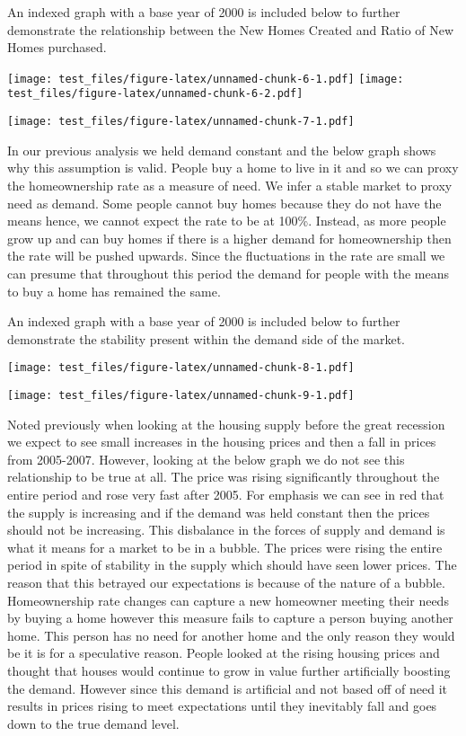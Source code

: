 \documentclass[
]{article}
\begin{document}
An indexed graph with a base year of 2000 is included below to further
demonstrate the relationship between the New Homes Created and Ratio of
New Homes purchased.

\texttt{[image: test\_files/figure-latex/unnamed-chunk-6-1.pdf]}
\texttt{[image: test\_files/figure-latex/unnamed-chunk-6-2.pdf]}

\texttt{[image: test\_files/figure-latex/unnamed-chunk-7-1.pdf]}

In our previous analysis we held demand constant and the below graph
shows why this assumption is valid. People buy a home to live in it and
so we can proxy the homeownership rate as a measure of need. We infer a
stable market to proxy need as demand. Some people cannot buy homes
because they do not have the means hence, we cannot expect the rate to
be at 100\%. Instead, as more people grow up and can buy homes if there
is a higher demand for homeownership then the rate will be pushed
upwards. Since the fluctuations in the rate are small we can presume
that throughout this period the demand for people with the means to buy
a home has remained the same.

An indexed graph with a base year of 2000 is included below to further
demonstrate the stability present within the demand side of the market.

\texttt{[image: test\_files/figure-latex/unnamed-chunk-8-1.pdf]}

\texttt{[image: test\_files/figure-latex/unnamed-chunk-9-1.pdf]}

Noted previously when looking at the housing supply before the great
recession we expect to see small increases in the housing prices and
then a fall in prices from 2005-2007. However, looking at the below
graph we do not see this relationship to be true at all. The price was
rising significantly throughout the entire period and rose very fast
after 2005. For emphasis we can see in red that the supply is increasing
and if the demand was held constant then the prices should not be
increasing. This disbalance in the forces of supply and demand is what
it means for a market to be in a bubble. The prices were rising the
entire period in spite of stability in the supply which should have seen
lower prices. The reason that this betrayed our expectations is because
of the nature of a bubble. Homeownership rate changes can capture a new
homeowner meeting their needs by buying a home however this measure
fails to capture a person buying another home. This person has no need
for another home and the only reason they would be it is for a
speculative reason. People looked at the rising housing prices and
thought that houses would continue to grow in value further artificially
boosting the demand. However since this demand is artificial and not
based off of need it results in prices rising to meet expectations until
they inevitably fall and goes down to the true demand level.
\end{document}
